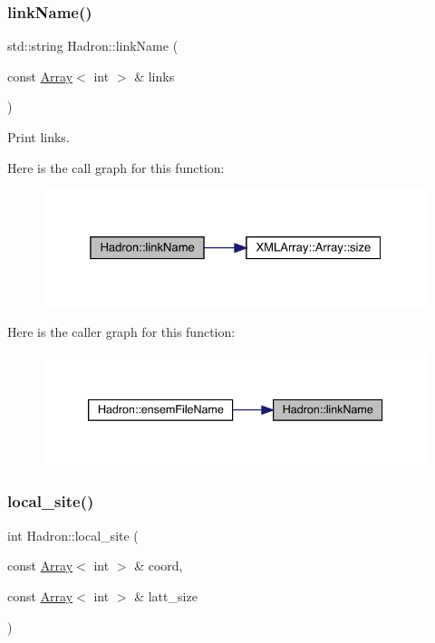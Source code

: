 \subsubsection{\texorpdfstring{linkName()}{linkName()}}
{\footnotesize\ttfamily std\+::string Hadron\+::link\+Name (\begin{DoxyParamCaption}\item[{const \mbox{\hyperlink{classXMLArray_1_1Array}{Array}}$<$ int $>$ \&}]{links }\end{DoxyParamCaption})}



Print links. 

Here is the call graph for this function\+:\nopagebreak
\begin{figure}[H]
\begin{center}
\leavevmode
\includegraphics[width=325pt]{d1/daf/namespaceHadron_afbb540812e62aedb8826e62c56efcff8_cgraph}
\end{center}
\end{figure}
Here is the caller graph for this function\+:\nopagebreak
\begin{figure}[H]
\begin{center}
\leavevmode
\includegraphics[width=339pt]{d1/daf/namespaceHadron_afbb540812e62aedb8826e62c56efcff8_icgraph}
\end{center}
\end{figure}
\mbox{\label{namespaceHadron_ab96485b602362d63c3326d4326e3733d}} 
\subsubsection{\texorpdfstring{local\_site()}{local\_site()}}
{\footnotesize\ttfamily int Hadron\+::local\+\_\+site (\begin{DoxyParamCaption}\item[{const \mbox{\hyperlink{classXMLArray_1_1Array}{Array}}$<$ int $>$ \&}]{coord,  }\item[{const \mbox{\hyperlink{classXMLArray_1_1Array}{Array}}$<$ int $>$ \&}]{latt\+\_\+size }\end{DoxyParamCaption})}



